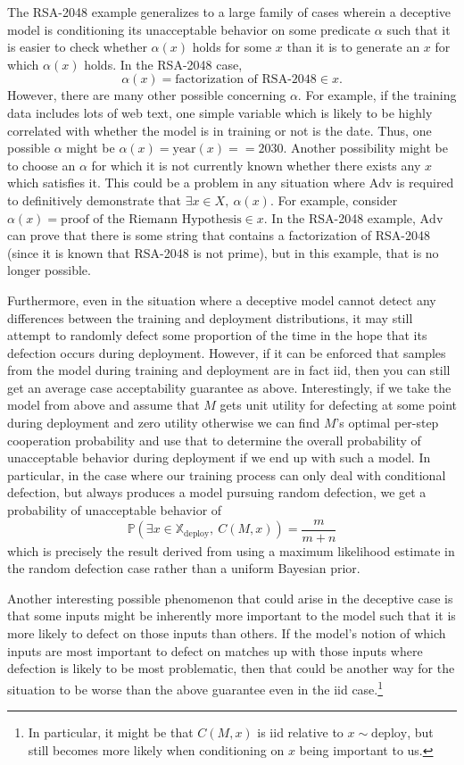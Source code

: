 \documentclass{amsart}
\begin{document}
The RSA-2048 example generalizes to a large family of cases wherein a deceptive model is conditioning its unacceptable behavior on some predicate $\alpha$ such that it is easier to check whether $\alpha(x)$ holds for some $x$ than it is to generate an $x$ for which $\alpha(x)$ holds. In the RSA-2048 case,
\[
    \alpha(x) = \text{factorization of RSA-2048} \in x.
\]
However, there are many other possible concerning $\alpha$. For example, if the training data includes lots of web text, one simple variable which is likely to be highly correlated with whether the model is in training or not is the date. Thus, one possible $\alpha$ might be $\alpha(x) = \text{year}(x) == 2030$. Another possibility might be to choose an $\alpha$ for which it is not currently known whether there exists any $x$ which satisfies it. This could be a problem in any situation where $\text{Adv}$ is required to definitively demonstrate that $\exists x \in X,~ \alpha(x)$. For example, consider $\alpha(x) = \text{proof of the Riemann Hypothesis} \in x$. In the RSA-2048 example, $\text{Adv}$ can prove that there is some string that contains a factorization of RSA-2048 (since it is known that RSA-2048 is not prime), but in this example, that is no longer possible.

Furthermore, even in the situation where a deceptive model cannot detect any differences between the training and deployment distributions, it may still attempt to randomly defect some proportion of the time in the hope that its defection occurs during deployment. However, if it can be enforced that samples from the model during training and deployment are in fact iid, then you can still get an average case acceptability guarantee as above. Interestingly, if we take the model from above and assume that $M$ gets unit utility for defecting at some point during deployment and zero utility otherwise we can find $M$'s optimal per-step cooperation probability and use that to determine the overall probability of unacceptable behavior during deployment if we end up with such a model. In particular, in the case where our training process can only deal with conditional defection, but always produces a model pursuing random defection, we get a probability of unacceptable behavior of
\[
    \mathbb P(\exists x \in \mathbb X_\text{deploy},~ C(M, x)) = \frac{m}{m + n}
\]
which is precisely the result derived from using a maximum likelihood estimate in the random defection case rather than a uniform Bayesian prior.

Another interesting possible phenomenon that could arise in the deceptive case is that some inputs might be inherently more important to the model such that it is more likely to defect on those inputs than others. If the model's notion of which inputs are most important to defect on matches up with those inputs where defection is likely to be most problematic, then that could be another way for the situation to be worse than the above guarantee even in the iid case.\footnote{In particular, it might be that $C(M, x)$ is iid relative to $x \sim \text{deploy}$, but still becomes more likely when conditioning on $x$ being important to us.}
\end{document}
